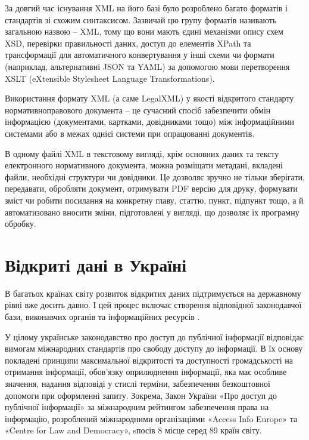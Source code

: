 За довгий час існування XML на його базі було розроблено багато форматів і стандартів зі
схожим синтаксисом. Зазвичай цю групу форматів називають загальною назвою – XML,
тому що вони мають єдині механізми опису схем XSD,
перевірки правильності даних, доступ до елементів XPath та трансформації для автоматичного конвертування
у інші схеми чи формати (наприклад, альтернативні JSON та YAML) за допомогою мови
перетворення XSLT (eXtensible Stylesheet Language Transformations).

Використання формату XML (а саме LegalXML) у якості відкритого стандарту
нормативноправового документа – це сучасний спосіб забезпечити обмін інформацією (документами,
картками, довідниками тощо) між інформаційними системами або в межах однієї системи
при опрацюванні документів.

В одному файлі XML в текстовому вигляді, крім основних даних та тексту електронного
нормативного документа, можна розміщати метадані, вкладені файли,
необхідні структури чи довідники. Це дозволяє зручно не тільки зберігати,
передавати, обробляти документ, отримувати PDF версію для друку, формувати зміст чи
робити посилання на конкретну главу, статтю, пункт, підпункт тощо, а й автоматизовано
вносити зміни, підготовлені у вигляді, що дозволяє їх програмну обробку.

\section{Відкриті дані в Україні}

В багатьох країнах світу розвиток відкритих даних підтримується на державному рівні вже досить давно.
І цей процес включає створення відповідної законодавчої бази, виконавчих органів та інформаційних ресурсів \cite{BeyondTransparency}.

У цілому українське законодавство про доступ до публічної
інформації відповідає вимогам міжнародних стандартів про свободу
доступу до інформації. В їх основу покладені принципи максимальної відкритості та доступності громадськості на отримання інформації, обов’язку оприлюднення інформації, яка має особливе значення,
надання відповіді у стислі терміни, забезпечення безкоштовної допомоги при оформленні запиту. Зокрема, Закон України «Про
доступ до публічної інформації» за міжнародним рейтингом забезпечення права на інформацію,
розроблений міжнародними організаціями «Access Info Europe» та «Centre for Law and Democracy»,
sпосів 8 місце серед 89 країн світу.

